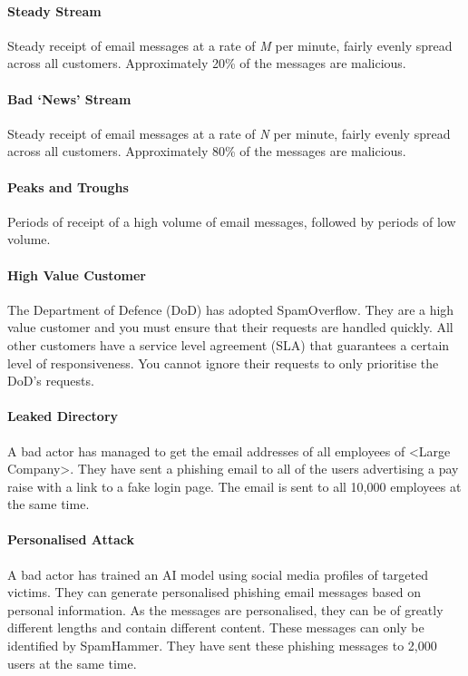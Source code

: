 \documentclass{csse4400}
\begin{document}
\paragraph{Steady Stream}
Steady receipt of email messages at a rate of \emph{M} per minute, fairly evenly spread across all customers.
Approximately 20\% of the messages are malicious.

\paragraph{Bad `News' Stream}
Steady receipt of email messages at a rate of \emph{N} per minute, fairly evenly spread across all customers.
Approximately 80\% of the messages are malicious.

\paragraph{Peaks and Troughs}
Periods of receipt of a high volume of email messages, followed by periods of low volume.

\paragraph{High Value Customer}
The Department of Defence (DoD) has adopted SpamOverflow.
They are a high value customer and you must ensure that their requests are handled quickly.
All other customers have a service level agreement (SLA) that guarantees a certain level of responsiveness.
You cannot ignore their requests to only prioritise the DoD's requests.

\paragraph{Leaked Directory}
A bad actor has managed to get the email addresses of all employees of <Large Company>.
They have sent a phishing email to all of the users advertising a pay raise with a link to a fake login page.
The email is sent to all 10,000 employees at the same time.

\paragraph{Personalised Attack}
A bad actor has trained an AI model using social media profiles of targeted victims.
They can generate personalised phishing email messages based on personal information.
As the messages are personalised, they can be of greatly different lengths and contain different content.
These messages can only be identified by SpamHammer.
They have sent these phishing messages to 2,000 users at the same time.
\end{document}
